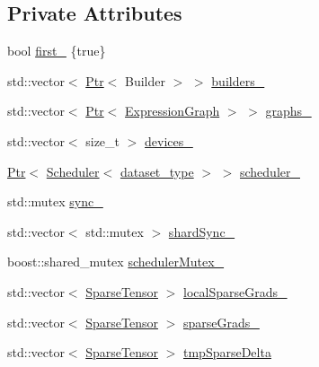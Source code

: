 \subsection*{Private Attributes}
\begin{DoxyCompactItemize}
\item 
bool \hyperlink{classmarian_1_1AsyncGraphGroup_af89976e48b8e21119bbf66ea7bc23d96}{first\+\_\+} \{true\}
\item 
std\+::vector$<$ \hyperlink{namespacemarian_ad1a373be43a00ef9ce35666145137b08}{Ptr}$<$ Builder $>$ $>$ \hyperlink{classmarian_1_1AsyncGraphGroup_a61b13f7dea620b83b33958d0b8970601}{builders\+\_\+}
\item 
std\+::vector$<$ \hyperlink{namespacemarian_ad1a373be43a00ef9ce35666145137b08}{Ptr}$<$ \hyperlink{classmarian_1_1ExpressionGraph}{Expression\+Graph} $>$ $>$ \hyperlink{classmarian_1_1AsyncGraphGroup_a3fbad41763c988a5723a39c2220287d8}{graphs\+\_\+}
\item 
std\+::vector$<$ size\+\_\+t $>$ \hyperlink{classmarian_1_1AsyncGraphGroup_a9fcc6fe896fe0c623a1cde656c6e123e}{devices\+\_\+}
\item 
\hyperlink{namespacemarian_ad1a373be43a00ef9ce35666145137b08}{Ptr}$<$ \hyperlink{classmarian_1_1Scheduler}{Scheduler}$<$ \hyperlink{classmarian_1_1AsyncGraphGroup_a94dd3794d340f8912f60a2c921a0dbf7}{dataset\+\_\+type} $>$ $>$ \hyperlink{classmarian_1_1AsyncGraphGroup_a3847200bdb1e584e006457113f3aafd1}{scheduler\+\_\+}
\item 
std\+::mutex \hyperlink{classmarian_1_1AsyncGraphGroup_a7951c0c9d8da435a148b509ff9694d0f}{sync\+\_\+}
\item 
std\+::vector$<$ std\+::mutex $>$ \hyperlink{classmarian_1_1AsyncGraphGroup_a5bf268b84c19070341c67f9c8617b1b2}{shard\+Sync\+\_\+}
\item 
boost\+::shared\+\_\+mutex \hyperlink{classmarian_1_1AsyncGraphGroup_a0592c560087d3adae51f637a383e1511}{scheduler\+Mutex\+\_\+}
\item 
std\+::vector$<$ \hyperlink{namespacemarian_a5484064f1fce2661d0b27a5c02a9392b}{Sparse\+Tensor} $>$ \hyperlink{classmarian_1_1AsyncGraphGroup_a29422f1a8b9a8e2cc732101a34557b61}{local\+Sparse\+Grads\+\_\+}
\item 
std\+::vector$<$ \hyperlink{namespacemarian_a5484064f1fce2661d0b27a5c02a9392b}{Sparse\+Tensor} $>$ \hyperlink{classmarian_1_1AsyncGraphGroup_a8270ea17d3e0ad0288686ecf8680b761}{sparse\+Grads\+\_\+}
\item 
std\+::vector$<$ \hyperlink{namespacemarian_a5484064f1fce2661d0b27a5c02a9392b}{Sparse\+Tensor} $>$ \hyperlink{classmarian_1_1AsyncGraphGroup_aac1e70623a858adb914f6ed6a491c3a8}{tmp\+Sparse\+Delta}

\end{DoxyCompactItemize}
